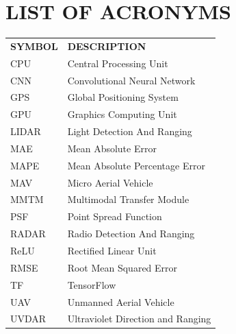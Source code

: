 \chapter*{LIST OF ACRONYMS} 

\begin{longtable}[l]{l l} 
   \textbf{SYMBOL}	& \textbf{DESCRIPTION} \\
   
    CPU     &   Central Processing Unit\\
    
    CNN		& 	Convolutional Neural Network\\ 
    
    GPS     &   Global Positioning System\\
    
    GPU     &  	Graphics Computing Unit\\
    
    LIDAR   &   Light Detection And Ranging\\

    MAE		&	Mean Absolute Error\\
    
    MAPE	&	Mean Absolute Percentage Error\\
    
    MAV     &   Micro Aerial Vehicle\\
    
    MMTM	&	Multimodal Transfer Module\\
    
    PSF		&	Point Spread Function\\
    
    RADAR   &   Radio Detection And Ranging\\

    ReLU	&	Rectified Linear Unit\\
    
    RMSE    &   Root Mean Squared Error\\
    
    TF		&	TensorFlow\\
    
    UAV     &   Unmanned Aerial Vehicle\\
    
    UVDAR   &   Ultraviolet Direction and Ranging\\
\end{longtable}
